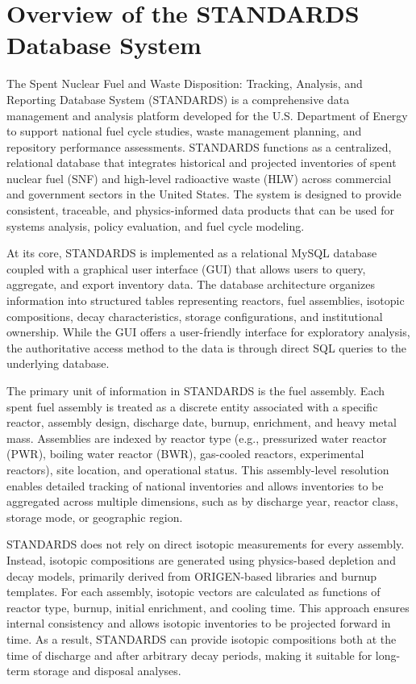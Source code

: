 \section{Overview of the STANDARDS Database System}

The Spent Nuclear Fuel and Waste Disposition: Tracking, Analysis, and Reporting Database System (STANDARDS) is a comprehensive data
 management and analysis platform developed for the U.S. Department of Energy to support national fuel cycle studies, waste 
 management planning, and repository performance assessments. STANDARDS functions as a centralized, relational database that 
 integrates historical and projected inventories of spent nuclear fuel (SNF) and high-level radioactive waste (HLW) across 
 commercial and government sectors in the United States. The system is designed to provide consistent, traceable, and 
 physics-informed data products that can be used for systems analysis, policy evaluation, and fuel cycle modeling.

At its core, STANDARDS is implemented as a relational MySQL database coupled with a graphical user interface (GUI) that 
allows users to query, aggregate, and export inventory data. The database architecture organizes information into structured 
tables representing reactors, fuel assemblies, isotopic compositions, decay characteristics, storage configurations, and 
institutional ownership. While the GUI offers a user-friendly interface for exploratory analysis, the authoritative access 
method to the data is through direct SQL queries to the underlying database.

The primary unit of information in STANDARDS is the fuel assembly. Each spent fuel assembly is treated as a discrete entity 
associated with a specific reactor, assembly design, discharge date, burnup, enrichment, and heavy metal mass. Assemblies are 
indexed by reactor type (e.g., pressurized water reactor (PWR), boiling water reactor (BWR), gas-cooled reactors, experimental 
reactors), site location, and operational status. This assembly-level resolution enables detailed tracking of national 
inventories and allows inventories to be aggregated across multiple dimensions, such as by discharge year, reactor class, 
storage mode, or geographic region.

STANDARDS does not rely on direct isotopic measurements for every assembly. Instead, isotopic compositions are generated 
using physics-based depletion and decay models, primarily derived from ORIGEN-based libraries and burnup templates. For 
each assembly, isotopic vectors are calculated as functions of reactor type, burnup, initial enrichment, and cooling time. 
This approach ensures internal consistency and allows isotopic inventories to be projected forward in time. As a result, 
STANDARDS can provide isotopic compositions both at the time of discharge and after arbitrary decay periods, making it 
suitable for long-term storage and disposal analyses.


